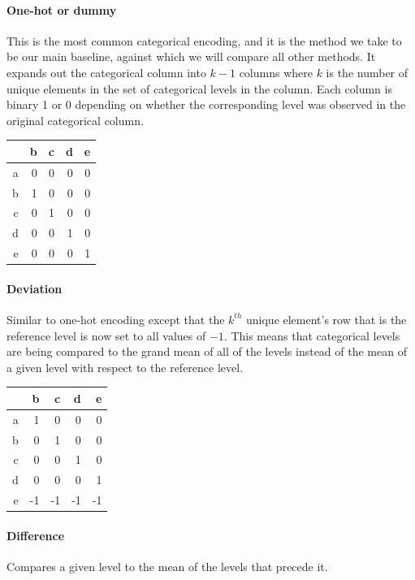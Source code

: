 \documentclass{article}
\theoremstyle{plain}
\theoremstyle{definition}
\theoremstyle{remark}
\begin{document}
\paragraph{One-hot or dummy} This is the most common categorical encoding, and it is the method we take to be our main baseline, against which we will compare all other methods. It expands out the categorical column into $k-1$ columns where $k$ is the number of unique elements in the set of categorical levels in the column. Each column is binary 1 or 0 depending on whether the corresponding level was observed in the original categorical column. \citep[~sec 2.3.2]{murphy2012machine}

\begin{table}[H]
	\centering
	\begin{tabular}{rrrrr}
		\hline
		& b & c & d & e \\
		\hline
		a & 0 & 0 & 0 & 0 \\
		b & 1 & 0 & 0 & 0 \\
		c & 0 & 1 & 0 & 0 \\
		d & 0 & 0 & 1 & 0 \\
		e & 0 & 0 & 0 & 1 \\
		\hline
	\end{tabular}
\end{table}

\paragraph{Deviation} Similar to one-hot encoding except that the $k^{th}$ unique element's row that is the reference level is now set to all values of $-1$. This means that categorical levels are being compared to the grand mean of all of the levels instead of the mean of a given level with respect to the reference level.

\begin{table}[H]
	\centering
	\begin{tabular}{rrrrr}
		\hline
		& b & c & d & e \\
		\hline
		a & 1 & 0 & 0 & 0 \\
		b & 0 & 1 & 0 & 0 \\
		c & 0 & 0 & 1 & 0 \\
		d & 0 & 0 & 0 & 1 \\
		e & -1 & -1 & -1 & -1 \\
		\hline
	\end{tabular}
\end{table}


\paragraph{Difference} Compares a given level to the mean of the levels that precede it.
\end{document}
